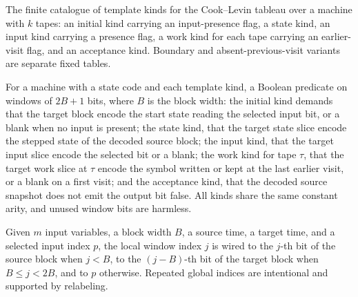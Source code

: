 \begin{definition}
\label{Complexity.CLTemplateKind}
\leanok
The finite catalogue of template kinds for the Cook--Levin tableau over a machine with $k$ tapes: an initial kind carrying an input-presence flag, a state kind, an input kind carrying a presence flag, a work kind for each tape carrying an earlier-visit flag, and an acceptance kind. Boundary and absent-previous-visit variants are separate fixed tables.
\end{definition}

\begin{definition}
\label{Complexity.clPredicate}
\leanok
{}
For a machine with a state code and each template kind, a Boolean predicate on windows of $2B+1$ bits, where $B$ is the block width: the initial kind demands that the target block encode the start state reading the selected input bit, or a blank when no input is present; the state kind, that the target state slice encode the stepped state of the decoded source block; the input kind, that the target input slice encode the selected bit or a blank; the work kind for tape $\tau$, that the target work slice at $\tau$ encode the symbol written or kept at the last earlier visit, or a blank on a first visit; and the acceptance kind, that the decoded source snapshot does not emit the output bit false. All kinds share the same constant arity, and unused window bits are harmless.
\end{definition}

\begin{definition}
\label{Complexity.clWire}
\leanok
{}
Given $m$ input variables, a block width $B$, a source time, a target time, and a selected input index $p$, the local window index $j$ is wired to the $j$-th bit of the source block when $j < B$, to the $(j-B)$-th bit of the target block when $B \le j < 2B$, and to $p$ otherwise. Repeated global indices are intentional and supported by relabeling.
\end{definition}

